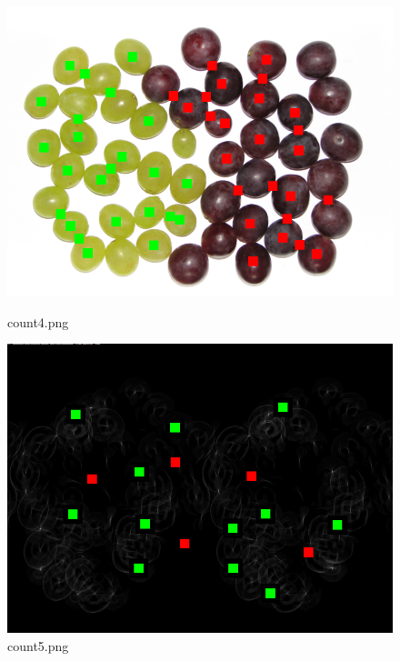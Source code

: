 \documentclass{classrep}
\begin{document}
\begin{figure}
  \begin{minipage}{0.3\linewidth}
    \centering
    \includegraphics[width=\textwidth]{gfx/count4_overlayed.png}
    \caption{count4.png}
    \label{fig:c4}
  \end{minipage}
  \hspace{0.5cm}
  \begin{minipage}{0.3\linewidth}
    \centering
    \includegraphics[width=\textwidth]{gfx/count5_overlayed.png}
    \caption{count5.png}
    \label{fig:c5}
  \end{minipage}
  \begin{minipage}{0.3\linewidth}
    \centering

\end{minipage}
\end{figure}
\end{document}
